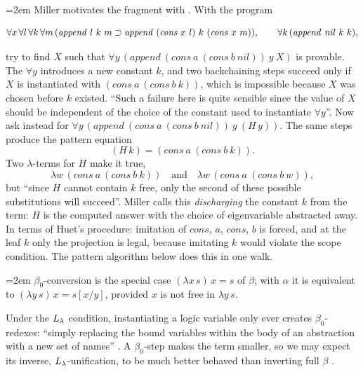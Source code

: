 \begin{example}\label{ex:hounif-discharge}
\emergencystretch=2em
Miller motivates the fragment with . With the program
\begin{fullwidth}
\[
  \forall x\,\forall l\,\forall k\,\forall m\,(\mathit{append}\ l\ k\ m\imp\mathit{append}\ (\mathit{cons}\ x\ l)\ k\ (\mathit{cons}\ x\ m)),
  \qquad\forall k\,(\mathit{append}\ \mathit{nil}\ k\ k),
\]
\end{fullwidth}
try to find $X$ such that $\forall y\,(\mathit{append}\ (\mathit{cons}\ a\ (\mathit{cons}\ b\ \mathit{nil}))\ y\ X)$ is
provable. The $\forall y$ introduces a new constant $k$, and two backchaining steps succeed only if
$X$ is instantiated with $(\mathit{cons}\ a\ (\mathit{cons}\ b\ k))$, which is impossible because $X$ was chosen
before $k$ existed. \enquote{Such a failure here is quite sensible since the value of $X$ should be independent of the
choice of the constant used to instantiate $\forall y$}. Now ask instead for
$\forall y\,(\mathit{append}\ (\mathit{cons}\ a\ (\mathit{cons}\ b\ \mathit{nil}))\ y\ (H\,y))$. The same steps
produce the pattern equation
\[(H\,k)=(\mathit{cons}\ a\ (\mathit{cons}\ b\ k)).\]
Two $\lambda$-terms for $H$ make it true,
\[\lambda w\,(\mathit{cons}\ a\ (\mathit{cons}\ b\ k))\quad\text{and}\quad
\lambda w\,(\mathit{cons}\ a\ (\mathit{cons}\ b\ w)),\]
but \enquote{since $H$ cannot contain $k$ free, only the second
of these possible substitutions will succeed}. Miller calls this \emph{discharging} the constant $k$ from the
term: $H$ is the computed answer with the choice of eigenvariable abstracted away. In terms of Huet's procedure: imitation of
$\mathit{cons}$, $a$, $\mathit{cons}$, $b$ is forced, and at the leaf $k$ only the projection is legal, because
imitating $k$ would violate the scope condition. The pattern algorithm below does this in one walk.
\end{example}

\begin{definition}
\emergencystretch=2em
$\beta_0$-conversion is the special case $(\lambda x\,s)\,x=s$ of $\beta$; with $\alpha$ it is equivalent to
$(\lambda y\,s)\,x=s[x/y]$, provided $x$ is not free in $\lambda y\,s$.
\end{definition}

Under the $L_\lambda$ condition, instantiating a logic variable only ever creates $\beta_0$-redexes: \enquote{simply
replacing the bound variables within the body of an abstraction with a new set of names} . A
$\beta_0$-step makes the term smaller, so we may expect its inverse, $L_\lambda$-unification, to be much better
behaved than inverting full $\beta$ .

